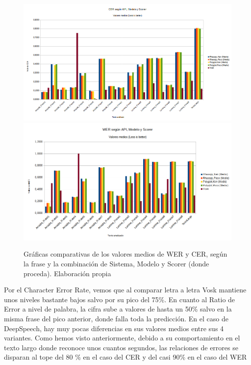 \begin{figure}[H]
	\includegraphics[width=\textwidth]{imagenes/CERMedios.png} \hfill \includegraphics[width=\textwidth]{imagenes/WERMedios.png}
	\caption{Gráficas comparativas de los valores medios de WER y CER, según la frase y la combinación de Sistema, Modelo y Scorer (donde proceda). Elaboración propia}
\end{figure}

Por el Character Error Rate, vemos que al comparar letra a letra Vosk mantiene unos niveles bastante bajos salvo por su pico del 75\%. En cuanto al Ratio de Error a nivel de palabra, la cifra sube a valores de hasta un 50\% salvo en la misma frase del pico anterior, donde falla toda la predicción.
En el caso de DeepSpeech, hay muy pocas diferencias en sus valores medios entre sus 4 variantes. Como hemos visto anteriormente, debido a su comportamiento en el texto largo donde reconoce unos cuantos segundos, las relaciones de errores se disparan al tope del 80
\% en el caso del CER y del casi 90\% en el caso del WER

